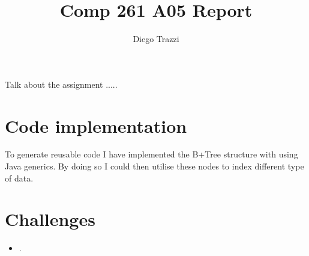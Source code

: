 \documentclass[11pt, oneside]{article} %
\title{Comp 261 A05 Report}
\author{Diego Trazzi}
\begin{document}
\maketitle
Talk about the assignment ..... 
\section{Code implementation}
To generate reusable code I have implemented the B+Tree structure with using Java generics. By doing so I could then utilise these nodes to index different type of data.
\section{Challenges}
\begin{itemize}
\item .
\end{itemize}
\end{document}
